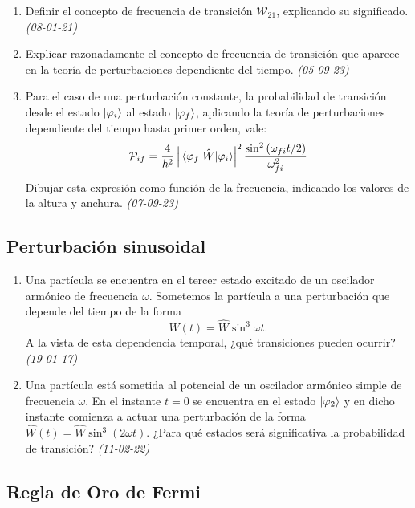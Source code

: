 \begin{enumerate}
    \item Definir el concepto de frecuencia de transición $\mathcal{W}_{21}$, explicando su significado. \textit{(08-01-21)}
    
    \item Explicar razonadamente el concepto de frecuencia de transición que aparece en la teoría de perturbaciones dependiente del tiempo. \textit{(05-09-23)}

    \item Para el caso de una perturbación constante, la probabilidad de transición desde el estado \(\ket{\varphi_i}\) al estado \(\ket{\varphi_f}\), aplicando la teoría de perturbaciones dependiente del tiempo hasta primer orden, vale:
    \[
    \mathcal{P}_{if} = \frac{4}{\hbar^2} \left| \mel{\varphi_f}{\hat{W}}{\varphi_i} \right|^2 \frac{\sin^2 \left( \omega_{fi} t / 2 \right)}{\omega_{fi}^2}
    \]
    Dibujar esta expresión como función de la frecuencia, indicando los valores de la altura y anchura. \textit{(07-09-23)}

\end{enumerate}

\subsection*{Perturbación sinusoidal}

\begin{enumerate}
    \item Una partícula se encuentra en el tercer estado excitado de un oscilador armónico de frecuencia $\omega$. Sometemos la partícula a una perturbación que depende del tiempo de la forma
    \[
    W(t) = \hat{W} \sin^3 \omega t.
    \]
    A la vista de esta dependencia temporal, ¿qué transiciones pueden ocurrir? \textit{(19-01-17)}

    \item Una partícula está sometida al potencial de un oscilador armónico simple de frecuencia $\omega$. En el instante $t = 0$ se encuentra en el estado $\ket{\varphi_2}$ y en dicho instante comienza a actuar una perturbación de la forma $\hat{W}(t) = \hat{W} \sin^3(2\omega t)$. ¿Para qué estados será significativa la probabilidad de transición? \textit{(11-02-22)}
\end{enumerate}

\subsection*{Regla de Oro de Fermi}

